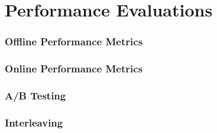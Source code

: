 %
%
%
\chapter{Performance Evaluations}
\label{intro} %

\subsection{Offline Performance Metrics}
\subsection{Online Performance Metrics}
\subsection{A/B Testing}
\subsection{Interleaving}



